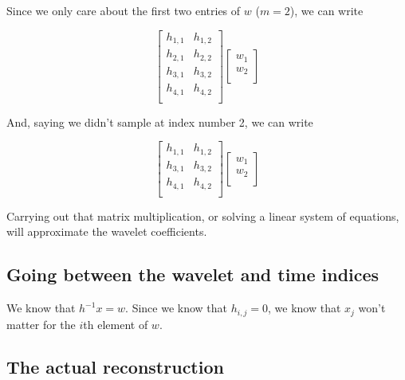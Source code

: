 \documentclass{article}
\begin{document}
            Since we only care about the first two entries of $w$ ($m=2$), we can write

            $$
                \begin{bmatrix}  
                    h_{1,1} & h_{1,2}  \\
                    h_{2,1} & h_{2,2}  \\
                    h_{3,1} & h_{3,2}  \\
                    h_{4,1} & h_{4,2}  \\
                
                \end{bmatrix}
                \begin{bmatrix}
                    w_1 \\ w_2 \\ 
                \end{bmatrix}
            $$

            And, saying we didn't sample at index number 2, we can write

            $$
                \begin{bmatrix}  
                    h_{1,1} & h_{1,2}  \\
                    h_{3,1} & h_{3,2}  \\
                    h_{4,1} & h_{4,2}  \\
                
                \end{bmatrix}
                \begin{bmatrix}
                    w_1 \\ w_2 \\ 
                \end{bmatrix}
            $$

            Carrying out that matrix multiplication, or solving a linear system of equations, will approximate the wavelet coefficients.

        \subsection{Going between the wavelet and time indices}

            We know that $h^{-1} x = w $. Since we know that  $h_{i, j} = 0$, we know that $x_j$ won't matter for the $i$th element of $w$.
            
        \subsection{The actual reconstruction}
\end{document}
